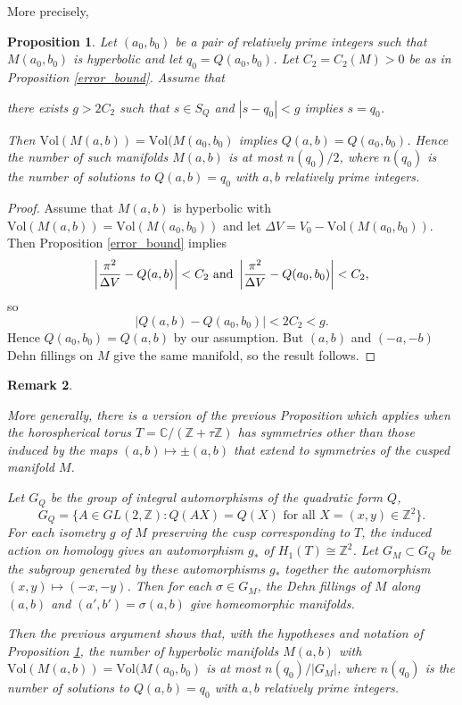 \documentclass[reqno]{amsproc}  %
\newtheorem{prop}{\bf Proposition}[section]
\newtheorem{rmk}[prop]{\bf Remark}
\def\C{\mathbb{C}}
\def\Z{\mathbb{Z}}
\def\vol{\text{Vol} }
\begin{document}
\newpage
More precisely, 
\begin{prop} \label{few_mflds_with_vol} 
Let  $(a_0,b_0)$ be a pair of relatively prime integers such that
$M(a_0,b_0)$ is hyperbolic and let $q_0 = Q(a_0,b_0)$.
Let $C_2 = C_2(M) >0$ be as in Proposition \ref{error_bound}.
Assume that 
\begin{center}
there exists $g > 2C_2$ such that $s \in S_Q$ and $|s-q_0|< g$ implies $s= q_0$.
\end{center}
Then $\vol(M(a,b)) =  \vol(M(a_0,b_0)$ implies $Q(a,b)=Q(a_0,b_0)$.
Hence the number of such manifolds $M(a,b)$  
is at most  $n(q_0)/2$, where $n(q_0)$  is the number of solutions to $Q(a,b)=q_0$ with $a,b$ relatively prime integers.
 \end{prop}

\begin{proof}
Assume that $M(a,b)$ is hyperbolic with $\vol(M(a,b)) =  \vol(M(a_0,b_0))$
 and let $\Delta V=  V_0 - \vol(M(a_0,b_0))$. 
 Then Proposition \ref{error_bound} implies 
$$\left| {\pi^2  \over \Delta V}  -Q(a,b) \right| < C_2 \text{ and } \left| {\pi^2  \over \Delta V}  -Q(a_0,b_0) \right| < C_2,$$
so 
 $$\left| Q(a,b)   - Q(a_0,b_0) \right| < 2C_2 < g.$$
  Hence $Q(a_0,b_0)=Q(a,b)$ by our assumption. 
  But $(a,b)$ and $(-a,-b)$ Dehn fillings on $M$ give the same manifold, so the result follows.
 \end{proof}
 
  \begin{rmk}  \label{few_with_symm} 
 {\em
More generally, there is a version of the previous Proposition which applies 
when the horospherical torus $T = \C/(\Z+\tau \Z)$ has symmetries other than those 
induced by the maps $(a,b) \mapsto \pm(a,b)$ that
 extend to symmetries of the cusped manifold $M$.  
 
 
Let $G_Q$ be the group of integral automorphisms of the quadratic form  $Q$, 
 \begin{equation}  \label{eq8}
 G_Q = \{ A \in GL(2,\Z) :  Q(A X )= Q( X  ) \text{ for all } X=(x,y) \in \Z^2 \}.
 \end{equation}
For each isometry $g$ of $M$ preserving the cusp corresponding to $T$, the induced action on
homology gives an automorphism $g_*$ of $H_1(T) \cong \Z^2$. Let $G_M \subset G_Q$
be the subgroup generated by these automorphisms $g_*$ together the automorphism 
$(x,y) \mapsto (-x,-y)$.  Then for each $\sigma \in G_M$, the Dehn fillings of $M$ along
$(a,b)$ and $(a',b')=\sigma(a,b)$ give homeomorphic manifolds. 

Then the previous argument shows that, with the hypotheses and notation of Proposition \ref{few_mflds_with_vol},
the number of hyperbolic manifolds $M(a,b)$ with  $\vol(M(a,b)) =  \vol(M(a_0,b_0)$ 
is at most  $n(q_0)/|G_M|$, where $n(q_0)$  is the number of solutions to 
$Q(a,b)=q_0$ with $a,b$ relatively prime integers.
} \end{rmk}
\end{document}
